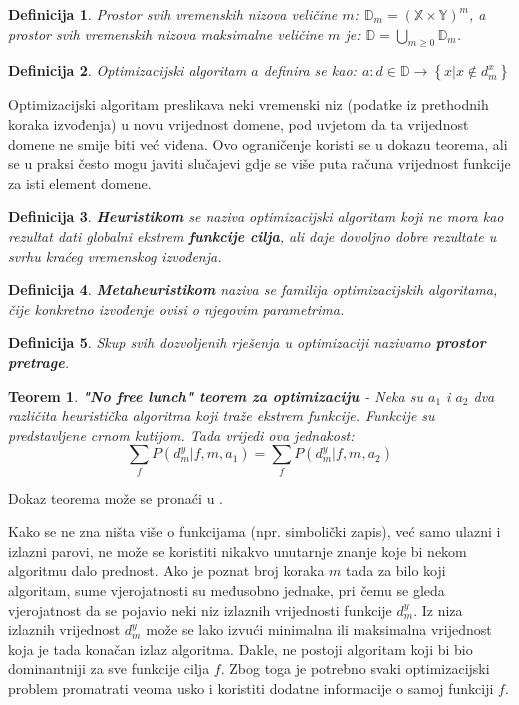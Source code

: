 \documentclass[times, utf8, diplomski, numeric]{fer}
\newtheorem{definition}{Definicija}
\newtheorem{theorem}{Teorem}
\begin{document}
\begin{definition}
Prostor svih vremenskih nizova veličine $m$: $\mathbb{D}_m = (\mathbb{X} \times \mathbb{Y})^m$, a prostor svih vremenskih nizova maksimalne veličine $m$ je: $\mathbb{D} = \bigcup_{m\ge0}\mathbb{D}_m$.
\end{definition}

\begin{definition}
Optimizacijski algoritam $a$ definira se kao: $a : d \in \mathbb{D} \rightarrow \left \{x | x \notin d_m^x \right \}$
\end{definition}

Optimizacijski algoritam preslikava neki vremenski niz (podatke iz prethodnih koraka izvođenja) u novu vrijednost domene, pod uvjetom da ta vrijednost domene ne smije biti već viđena. Ovo ograničenje koristi se u dokazu teorema, ali se u praksi često mogu javiti slučajevi gdje se više puta računa vrijednost funkcije za isti element domene.

\begin{definition}
\textbf{Heuristikom} se naziva optimizacijski algoritam koji ne mora kao rezultat dati globalni ekstrem \textbf{funkcije cilja}, ali daje dovoljno dobre rezultate u svrhu kraćeg vremenskog izvođenja. 
\end{definition}

\begin{definition}
\textbf{Metaheuristikom} naziva se familija optimizacijskih algoritama, čije konkretno izvođenje ovisi o njegovim parametrima.
\end{definition}

\begin{definition}
Skup svih dozvoljenih rješenja u optimizaciji nazivamo \textbf{prostor pretrage}.
\end{definition}

\begin{theorem}
\label{thm:nofreelunch}
\textbf{"No free lunch" teorem za optimizaciju} - Neka su $a_1$ i $a_2$ dva različita heuristička algoritma koji traže ekstrem funkcije. Funkcije su predstavljene crnom kutijom. Tada vrijedi ova jednakost:
\begin{equation}
	\sum_{f}P(d_m^y|f,m,a_1) = \sum_{f}P(d_m^y|f,m,a_2)
\end{equation}
\end{theorem}

Dokaz teorema može se pronaći u \cite{lit15}.

Kako se ne zna ništa više o funkcijama (npr. simbolički zapis), već samo ulazni i izlazni parovi, ne može se koristiti nikakvo unutarnje znanje koje bi nekom algoritmu dalo prednost. Ako je poznat broj koraka $m$ tada za bilo koji algoritam, sume vjerojatnosti su međusobno jednake, pri čemu se gleda vjerojatnost da se pojavio neki niz izlaznih vrijednosti funkcije $d_m^y$.
Iz niza izlaznih vrijednost $d_m^y$ može se lako izvući minimalna ili maksimalna vrijednost koja je tada konačan izlaz algoritma. Dakle, ne postoji algoritam koji bi bio dominantniji za sve funkcije cilja $f$. Zbog toga je potrebno svaki optimizacijski problem promatrati veoma usko i koristiti dodatne informacije o samoj funkciji $f$.
\end{document}
